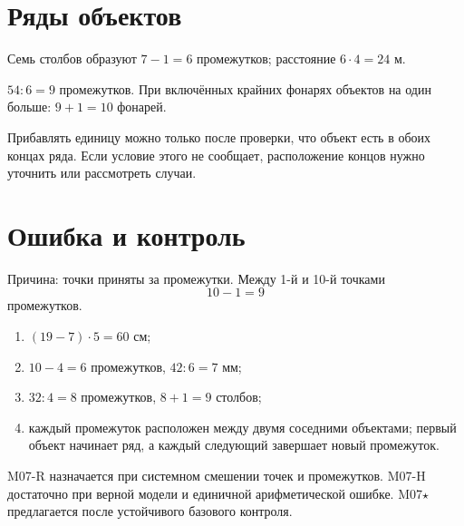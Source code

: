 \section{Ряды объектов}

\postrowfigure

\begin{practicebox}[5. Столбы]
  Семь столбов образуют $7-1=6$ промежутков; расстояние
  $6\cdot4=24$ м.
\end{practicebox}

\begin{practicebox}[6. Фонари]
  $54:6=9$ промежутков. При включённых крайних фонарях объектов на один
  больше: $9+1=10$ фонарей.
\end{practicebox}

\begin{teacherbox}
  Прибавлять единицу можно только после проверки, что объект есть в обоих
  концах ряда. Если условие этого не сообщает, расположение концов нужно
  уточнить или рассмотреть случаи.
\end{teacherbox}

\section{Ошибка и контроль}

\begin{warningbox}
  Причина: точки приняты за промежутки. Между 1-й и 10-й точками
  \[
    10-1=9
  \]
  промежутков.
\end{warningbox}

\begin{checkpointbox}[Ответы]
  \begin{enumerate}[label=\textbf{\arabic*.}]
    \item $(19-7)\cdot5=60$ см;
    \item $10-4=6$ промежутков, $42:6=7$ мм;
    \item $32:4=8$ промежутков, $8+1=9$ столбов;
    \item каждый промежуток расположен между двумя соседними объектами;
      первый объект начинает ряд, а каждый следующий завершает новый
      промежуток.
  \end{enumerate}
\end{checkpointbox}

\begin{teacherbox}
  M07-R назначается при системном смешении точек и промежутков. M07-H
  достаточно при верной модели и единичной арифметической ошибке.
  M07\(\star\) предлагается после устойчивого базового контроля.
\end{teacherbox}

